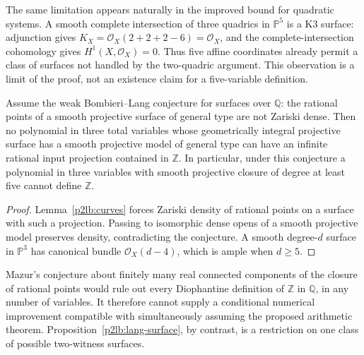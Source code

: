 The same limitation appears naturally in the improved bound for
quadratic systems.  A smooth complete intersection of three quadrics
in $\mathbb P^5$ is a K3 surface: adjunction gives
$K_X=\mathcal O_X(2+2+2-6)=\mathcal O_X$, and the
complete-intersection cohomology gives $H^1(X,\mathcal O_X)=0$.
Thus five affine coordinates already permit a class of surfaces not
handled by the two-quadric argument.  This observation is a limit of
the proof, not an existence claim for a five-variable definition.

\begin{proposition}
\label{p2lb:lang-surface}
Assume the weak Bombieri--Lang conjecture for surfaces over $\mathbb Q$:
the rational points of a smooth projective surface of general type are
not Zariski dense.  Then no polynomial in three total variables whose
geometrically integral projective surface has a smooth projective
model of general type can have an infinite rational input projection
contained in $\mathbb Z$.
In particular, under this conjecture a polynomial in three variables
with smooth projective closure of degree at least five cannot define
$\mathbb Z$.
\end{proposition}
\begin{proof}
Lemma~\ref{p2lb:curves} forces Zariski density of rational points
on a surface with such a projection.  Passing to isomorphic dense
opens of a smooth projective model preserves density, contradicting
the conjecture.  A smooth degree-$d$ surface in $\mathbb P^3$ has
canonical bundle $\mathcal O_X(d-4)$, which is ample when $d\geq5$.
\end{proof}

Mazur's conjecture about finitely many real connected components of
the closure of rational points would rule out every Diophantine
definition of $\mathbb Z$ in $\mathbb Q$, in any number of variables.
It therefore cannot supply a conditional numerical improvement
compatible with simultaneously assuming the proposed arithmetic
theorem.  Proposition~\ref{p2lb:lang-surface}, by contrast, is a
restriction on one class of possible two-witness surfaces.

